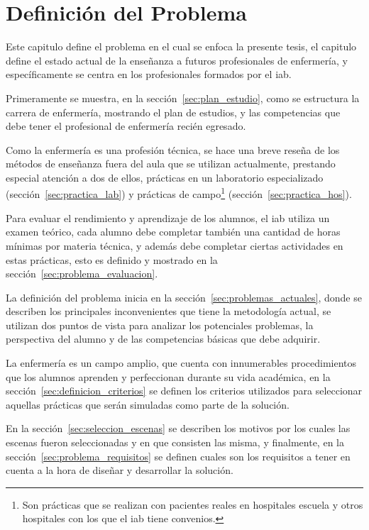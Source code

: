 \chapter{Definición del Problema}
\label{chap:problema}

Este capitulo define el problema en el cual se enfoca la presente tesis, el
capitulo define el estado actual de la enseñanza a futuros profesionales de
enfermería, y específicamente se centra en los profesionales formados por el
\Gls{iab}. 

Primeramente se muestra, en la sección~\ref{sec:plan_estudio}, como se
estructura la carrera de enfermería, mostrando el plan de estudios, y las
competencias que debe tener el profesional de enfermería recién egresado.

Como la enfermería es una profesión técnica, se hace una breve reseña de los
métodos de enseñanza fuera del aula que se utilizan actualmente, prestando
especial atención a dos de ellos, prácticas en un laboratorio especializado
(sección~\ref{sec:practica_lab}) y prácticas de campo\footnote{Son prácticas
    que se realizan con pacientes reales en hospitales escuela y otros
    hospitales con los que el \Gls{iab} tiene
    convenios.} (sección~\ref{sec:practica_hos}).

Para evaluar el rendimiento y aprendizaje de los alumnos, el \Gls{iab} utiliza
un examen teórico, cada alumno debe completar también una cantidad de horas
mínimas por materia técnica, y además debe completar ciertas actividades en
estas prácticas, esto es definido y mostrado en la
sección~\ref{sec:problema_evaluacion}.

La definición del problema inicia en la sección~\ref{sec:problemas_actuales},
donde se describen los principales inconvenientes que tiene la metodología
actual, se utilizan dos puntos de vista para analizar los potenciales problemas,
la perspectiva del alumno y de las competencias básicas que debe adquirir.


La enfermería es un campo amplio, que cuenta con innumerables procedimientos que
los alumnos aprenden y perfeccionan durante su vida académica, en la
sección~\ref{sec:definicion_criterios} se definen los criterios utilizados para
seleccionar aquellas prácticas que serán simuladas como parte de la solución.

En la sección~\ref{sec:seleccion_escenas} se describen los motivos por los
cuales las escenas fueron seleccionadas y en que consisten las misma, y
finalmente, en la sección~\ref{sec:problema_requisitos} se definen cuales son
los requisitos a tener en cuenta a la hora de diseñar y desarrollar la
solución.









